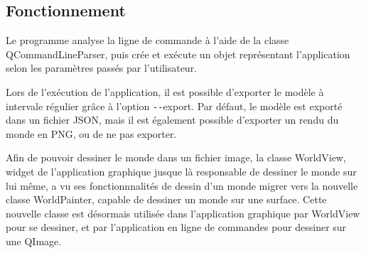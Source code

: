 \subsection{Fonctionnement}

Le programme analyse la ligne de commande à l'aide de la classe QCommandLineParser, puis crée et exécute un objet représentant l'application selon les paramètres passés par l'utilisateur.

Lors de l'exécution de l'application, il est possible d'exporter le modèle à intervale régulier grâce à l'option \texttt{-{}-}export. Par défaut, le modèle est exporté dans un fichier JSON, mais il est également possible d'exporter un rendu du monde en PNG, ou de ne pas exporter.

Afin de pouvoir dessiner le monde dans un fichier image, la classe WorldView, widget de l'application graphique jusque là responsable de dessiner le monde sur lui même, a vu ses fonctionnnalités de dessin d'un monde migrer vers la nouvelle classe WorldPainter, capable de dessiner un monde sur une surface.
Cette nouvelle classe est désormais utilisée dans l'application graphique par WorldView pour se dessiner, et par l'application en ligne de commandes pour dessiner sur une QImage.
